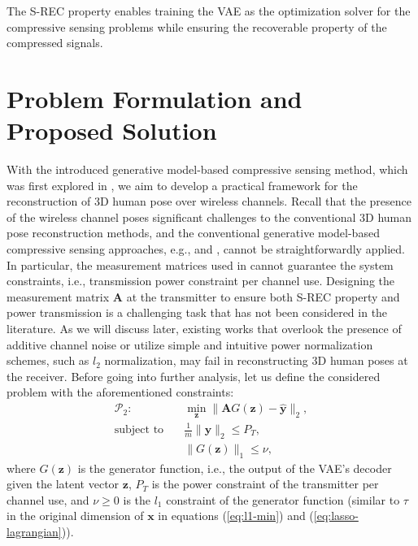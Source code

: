 \documentclass[conference, 10pt]{IEEEtran}
\begin{document}
The S-REC property enables training the VAE as the optimization solver for the compressive sensing problems while ensuring the recoverable property of the compressed signals.

\section{Problem Formulation and Proposed Solution}
With the introduced generative model-based compressive sensing method, which was first explored in \cite{bora2017compressed}, we aim to develop a practical framework for the reconstruction of 3D human pose over wireless channels. Recall that the presence of the wireless channel poses significant challenges to the conventional 3D human pose reconstruction methods, and the conventional generative model-based compressive sensing approaches, e.g., \cite{bora2017compressed} and \cite{dhar2018modeling}, cannot be straightforwardly applied. In particular, the measurement matrices used in \cite{bora2017compressed, dhar2018modeling} cannot guarantee the system constraints, i.e., transmission power constraint per channel use.
Designing the measurement matrix $\mathbf{A}$ at the transmitter to ensure both S-REC property and power transmission is a challenging task that has not been considered in the literature. As we will discuss later, existing works that overlook the presence of additive channel noise or utilize simple and intuitive power normalization schemes, such as $l_2$ normalization, may fail in reconstructing 3D human poses at the receiver. Before going into further analysis, let us define the considered problem with the aforementioned constraints:
\begin{equation}
\label{eq:problem-main}
\begin{split}
\mathcal{P}_2: \quad & \min_{\mathbf{z}} \|\mathbf{A} G(\mathbf{z}) - \mathbf{\hat{y}}\|_2, \\
\text{subject to} \quad & \frac{1}{m} \|\mathbf{y}\|_2 \leq P_T, \\
				 \quad & \|G(\mathbf{z})\|_1 \leq \nu,
\end{split}
\end{equation}
where $G(\mathbf{z})$ is the generator function, i.e., the output of the VAE's decoder given the latent vector $\mathbf{z}$, $P_T$ is the power constraint of the transmitter per channel use, and $\nu \geq 0$ is the $l_1$ constraint of the generator function (similar to $\tau$ in the original dimension of $\mathbf{x}$ in equations (\ref{eq:l1-min}) and (\ref{eq:lasso-lagrangian})).
\end{document}
